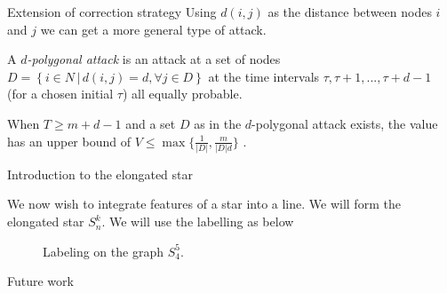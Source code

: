 \documentclass[11pt]{beamer}
\newcommand{\set}[2]{\left\{ #1 \, | \, #2 \right\}}
\begin{document}
\begin{frame}{Extension of correction strategy}
Using $d(i,j)$ as the distance between nodes $i$ and $j$ we can get a more general type of attack.

\begin{definition}
A \textit{$d$-polygonal attack} is an attack at a set of nodes $D= \set{i \in N}{ d(i,j)=d , \forall j \in D}$ at the time intervals $\tau,\tau+1,...,\tau+d-1$ (for a chosen initial $\tau$) all equally probable.
\end{definition}

\begin{lemma}
When $T \geq m+d-1$ and a set $D$ as in the $d$-polygonal attack exists, the value has an upper bound of $V \leq \max \{ \frac{1}{|D|} , \frac{m}{|D|d} \}$ .
\end{lemma}

\end{frame}

\hypertarget{Introduction to the elongated star}{}
\begin{frame}{Introduction to the elongated star}


We now wish to integrate features of a star into a line.
We will form the elongated star $S_{n}^{k}$. We will use the labelling as below

\begin{figure}
\begin{center}
\end{center}
\caption{Labeling on the graph $S_{4}^5$.}
\end{figure}

\end{frame}

\hypertarget{Future work}{}
\begin{frame}{Future work}
\end{frame}
\end{document}
